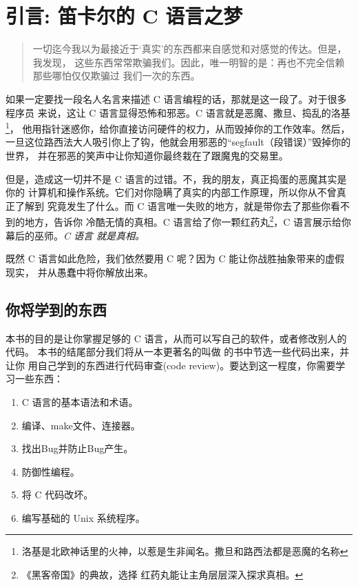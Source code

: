 \chapter*{引言: 笛卡尔的 C 语言之梦}

\begin{quotation}

一切迄今我以为最接近于‘真实’的东西都来自感觉和对感觉的传达。但是，我发现，
这些东西常常欺骗我们。因此，唯一明智的是：再也不完全信赖那些哪怕仅仅欺骗过
我们一次的东西。

\end{quotation}

如果一定要找一段名人名言来描述 C 语言编程的话，那就是这一段了。对于很多程序员
来说，这让 C 语言显得恐怖和邪恶。C 语言就是恶魔、撒旦、捣乱的洛基\footnote[译注1]{洛基是北欧神话里的火神，以惹是生非闻名。撒旦和路西法都是恶魔的名称}，
他用指针迷惑你，给你直接访问硬件的权力，从而毁掉你的工作效率。然后，
一旦这位路西法大人吸引你上了钩，他就会用邪恶的“segfault（段错误）”毁掉你的世界，
并在邪恶的笑声中让你知道你最终栽在了跟魔鬼的交易里。

但是，造成这一切并不是 C 语言的过错。不，我的朋友，真正捣蛋的恶魔其实是你的
计算机和操作系统。它们对你隐瞒了真实的内部工作原理，所以你从不曾真正了解到
究竟发生了什么。而 C 语言唯一失败的地方，就是带你去了那些你看不到的地方，告诉你
冷酷无情的真相。C 语言给了你一颗红药丸\footnote[译注2]{《黑客帝国》的典故，选择
红药丸能让主角层层深入探求真相。}，C 语言展示给你幕后的巫师。\emph{C 语言
就是真相。}

既然 C 语言如此危险，我们依然要用 C 呢？因为 C 能让你战胜抽象带来的虚假现实，
并从愚蠢中将你解放出来。

\section*{你将学到的东西}

本书的目的是让你掌握足够的 C 语言，从而可以写自己的软件，或者修改别人的代码。
本书的结尾部分我们将从一本更著名的叫做 \krc 的书中节选一些代码出来，并让你
用自己学到的东西进行代码审查(code review)。要达到这一程度，你需要学习一些东西：

\begin{enumerate}
\item C 语言的基本语法和术语。
\item 编译、make文件、连接器。
\item 找出Bug并防止Bug产生。
\item 防御性编程。
\item 将 C 代码改坏。
\item 编写基础的 Unix 系统程序。
\end{enumerate}


